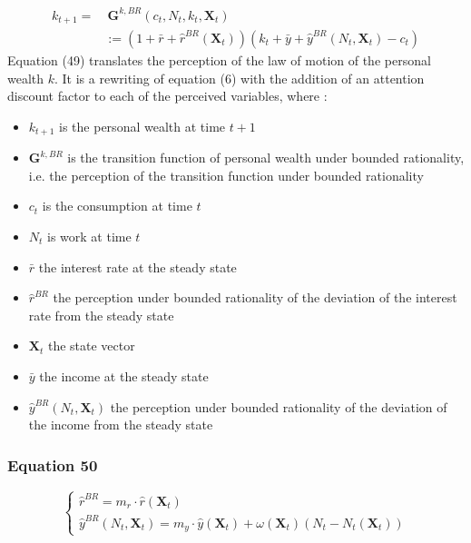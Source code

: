 \documentclass{article}
\begin{document}
\begin{equation} \tag{49}
    \begin{split}
        k_{t+1}= &\  \textbf{G}^{k,BR}(c_{t},N_{t},k_{t},\textbf{X}_{t}) \\
        & := (1+\bar{r}+\hat{r}^{BR}(\textbf{X}_t))(k_{t}+\bar{y}+\hat{y}^{BR}(N_{t},\textbf{X}_t)-c_{t})
    \end{split}
\end{equation}
Equation (49) translates the perception of the law of motion of the personal wealth $k$. It is a rewriting of equation (6) with the addition of an attention discount factor to each of the perceived variables, where : 
\begin{itemize}
    \item $k_{t+1}$ is the personal wealth at time $t+1$
    \item $\textbf{G}^{k,BR}$ is the transition function of personal wealth under bounded rationality, i.e. the perception of the transition function under bounded rationality
    \item $c_t$ is the consumption at time $t$
    \item $N_{t}$ is work at time $t$
    \item $\bar{r}$ the interest rate at the steady state
    \item $\hat{r}^{BR}$ the perception under bounded rationality of the deviation of the interest rate from the steady state 
    \item $\textbf{X}_t$ the state vector
    \item $\bar{y}$ the income at the steady state 
    \item $\hat{y}^{BR}(N_t,\textbf{X}_{t})$ the perception under bounded rationality of the deviation of the income from the steady state
\end{itemize}

\subsubsection*{Equation 50}

\begin{equation}\tag{50}
    \begin{cases}
        \hat{r}^{BR} = m_{r}\cdot\hat{r}(\textbf{X}_{t}) \\
        \hat{y}^{BR}(N_{t},\textbf{X}_{t}) = m_{y}\cdot\hat{y}(\textbf{X}_{t})+\omega(\textbf{X}_{t})(N_{t}-N_{t}(\textbf{X}_{t}))
    \end{cases}
\end{equation}
\end{document}
